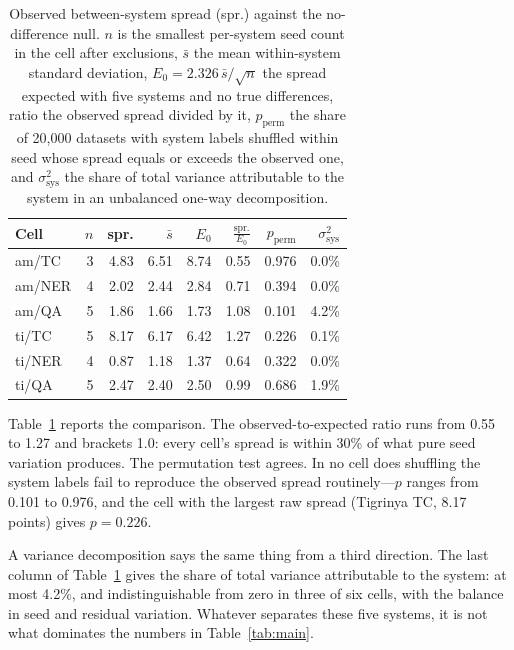 \documentclass[11pt]{article}
\begin{document}
\begin{table}[t]
\centering
\small
\setlength{\tabcolsep}{3.5pt}
\begin{tabular}{l@{\;}rrrrrrr}
\toprule
Cell & $n$ & spr. & $\bar{s}$ & $E_{0}$ & $\frac{\text{spr.}}{E_0}$ & $p_{\text{perm}}$ & $\sigma^2_{\text{sys}}$ \\
\midrule
am/TC  & 3 &  4.83 &  6.51 & 8.74 & 0.55 & 0.976 & 0.0\% \\
am/NER & 4 &  2.02 &  2.44 & 2.84 & 0.71 & 0.394 & 0.0\% \\
am/QA  & 5 &  1.86 &  1.66 & 1.73 & 1.08 & 0.101 & 4.2\% \\
ti/TC  & 5 &  8.17 &  6.17 & 6.42 & 1.27 & 0.226 & 0.1\% \\
ti/NER & 4 &  0.87 &  1.18 & 1.37 & 0.64 & 0.322 & 0.0\% \\
ti/QA  & 5 &  2.47 &  2.40 & 2.50 & 0.99 & 0.686 & 1.9\% \\
\bottomrule
\end{tabular}
\caption{Observed between-system spread (spr.) against the no-difference
null. $n$ is the smallest per-system seed count in the cell after exclusions,
$\bar{s}$ the mean within-system standard deviation,
$E_{0} = 2.326\,\bar{s}/\sqrt{n}$ the spread expected with five
systems and no true differences, ratio the observed spread divided by it,
$p_{\text{perm}}$ the share of 20{,}000 datasets with system labels shuffled
within seed whose spread equals or exceeds the observed one, and
$\sigma^2_{\text{sys}}$ the share of total variance attributable to the
system in an unbalanced one-way decomposition.}
\label{tab:resolution}
\end{table}

Table~\ref{tab:resolution} reports the comparison. The observed-to-expected
ratio runs from 0.55 to 1.27 and brackets 1.0: every cell's spread is within
30\% of what pure seed variation produces. The permutation test agrees. In no
cell does shuffling the system labels fail to reproduce the observed spread
routinely---$p$ ranges from 0.101 to 0.976, and the cell with the largest raw
spread (Tigrinya TC, 8.17 points) gives $p = 0.226$.

A variance decomposition says the same thing from a third direction. The
last column of Table~\ref{tab:resolution} gives the share of total variance
attributable to the system: at most 4.2\%, and indistinguishable from zero in
three of six cells, with the balance in seed and residual variation. Whatever
separates these five systems, it is not what dominates the numbers in
Table~\ref{tab:main}.
\end{document}
